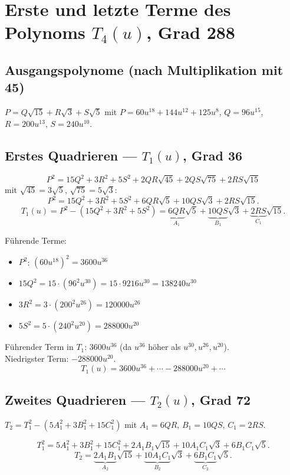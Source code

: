 \section{Erste und letzte Terme des Polynoms $T_4(u)$, Grad 288}


\subsection{Ausgangspolynome (nach Multiplikation mit 45)}

$P=Q\sqrt{15}+R\sqrt{3}+S\sqrt{5}$ mit
$P=60u^{18}+144u^{12}+125u^8$,
$Q=96u^{15}$, $R=200u^{13}$, $S=240u^{10}$.

\subsection{Erstes Quadrieren — $T_1(u)$, Grad 36}

\[
  P^2 = 15Q^2+3R^2+5S^2+2QR\sqrt{45}+2QS\sqrt{75}+2RS\sqrt{15}
\]
mit $\sqrt{45}=3\sqrt{5}$, $\sqrt{75}=5\sqrt{3}$:
\[
  P^2 = 15Q^2+3R^2+5S^2+6QR\sqrt{5}+10QS\sqrt{3}+2RS\sqrt{15}.
\]
\[
  T_1(u) = P^2-(15Q^2+3R^2+5S^2)
  = \underbrace{6QR}_{A_1}\sqrt{5}+\underbrace{10QS}_{B_1}\sqrt{3}
  +\underbrace{2RS}_{C_1}\sqrt{15}.
\]

Führende Terme:
\begin{itemize}
  \item $P^2$: $(60u^{18})^2=3600u^{36}$
  \item $15Q^2=15\cdot(96^2u^{30})=15\cdot9216u^{30}=138240u^{30}$
  \item $3R^2=3\cdot(200^2u^{26})=120000u^{26}$
  \item $5S^2=5\cdot(240^2u^{20})=288000u^{20}$
\end{itemize}
Führender Term in $T_1$: $3600u^{36}$ (da $u^{36}$ höher als $u^{30},u^{26},u^{20}$).\\
Niedrigster Term: $-288000u^{20}$.
\[
  T_1(u) = 3600u^{36}+\cdots-288000u^{20}+\cdots
\]

\subsection{Zweites Quadrieren — $T_2(u)$, Grad 72}

$T_2=T_1^2-(5A_1^2+3B_1^2+15C_1^2)$
mit $A_1=6QR$, $B_1=10QS$, $C_1=2RS$.

\[
  T_1^2 = 5A_1^2+3B_1^2+15C_1^2+2A_1B_1\sqrt{15}+10A_1C_1\sqrt{3}+6B_1C_1\sqrt{5}.
\]
\[
  T_2 = \underbrace{2A_1B_1}_{A_2}\sqrt{15}+\underbrace{10A_1C_1}_{B_2}\sqrt{3}
  +\underbrace{6B_1C_1}_{C_2}\sqrt{5}.
\]

